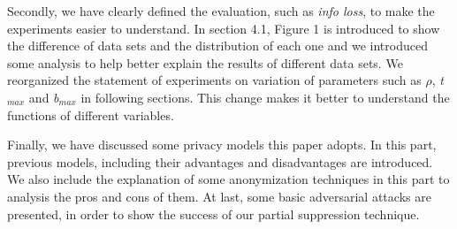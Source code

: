 Secondly, we have clearly defined the evaluation, such as \emph{info loss}, to make the experiments easier to understand. In section 4.1, Figure 1 is introduced to show the difference of data sets and the distribution of each one and we introduced some analysis to help better explain the results of different data sets. We reorganized the statement of experiments on variation of parameters such as $\rho$, \emph{t$_{max}$} and \emph{b$_{max}$} in following sections. This change makes it better to understand the functions of different variables.

Finally, we have discussed some privacy models this paper adopts. In this part, previous models, including their advantages and disadvantages are introduced. We also include the explanation of some anonymization techniques in this part to analysis the pros and cons of them. At last, some basic adversarial attacks are presented, in order to show the success of our partial suppression technique.